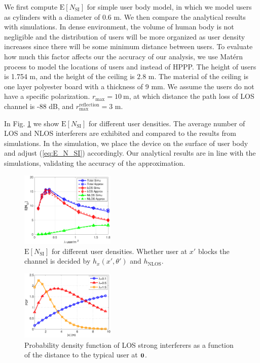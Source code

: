 \documentclass[10pt, conference, letterpaper]{IEEEtran}
\newcommand*{\Rom}[1]{\uppercase\expandafter{\romannumeral #1\relax}} %
\begin{document}
We first compute $\mathrm{E}[N_{\mathrm{SI}}]$ for simple user body model, in which we model users as cylinders with a diameter of 0.6 m. We then compare the analytical results with simulations. In dense environment, the volume of human body is not negligible and the distribution of users will be more organized as user density increases since there will be some minimum distance between users. To evaluate how much this factor affects our the accuracy of our analysis, we use Mat\'ern \Rom{3} process \cite{matern} to model the locations of users and instead of HPPP. The height of users is 1.754 m, and the height of the ceiling is $2.8$ m. The material of the ceiling is one layer polyester board with a thickness of 9 mm. We assume the users do not have a specific polarization. $r_{\max} = 10\mathrm{~m}$, at which distance the path loss of LOS channel is -88 dB, and $r_{\max}^{\mathrm{reflection}} = 3$ m. 

In Fig. \ref{fig:Channel_en_si} we show $\mathrm{E}[N_{\mathrm{SI}}]$ for different user densities. The average number of LOS and NLOS interferers are exhibited and compared to the results from simulations. In the simulation, we place the device on the surface of user body and adjust (\ref{eq:E_N_SI}) accordingly. Our analytical results are in line with the simulations, validating the accuracy of the approximation. 

\begin{figure}
	\centering
	\includegraphics[width = 0.4\textwidth]{Channel_en_si.pdf}
	\caption{$\mathrm{E}[N_{\mathrm{SI}}]$ for different user densities. Whether user at $x'$ blocks the channel is decided by $h_x(x',\theta')$ and $h_{\mathrm{NLOS}}$.}
	\label{fig:Channel_en_si}
\end{figure}


\begin{figure}
	\centering
	\includegraphics[width = 0.4\textwidth]{Channel_si_pdf.pdf}
	\caption{Probability density function of LOS strong interferers as a function of the distance to the typical user at $\bf{0}$.}
	\label{fig:Channel_si_pdf}
\end{figure}
\end{document}
